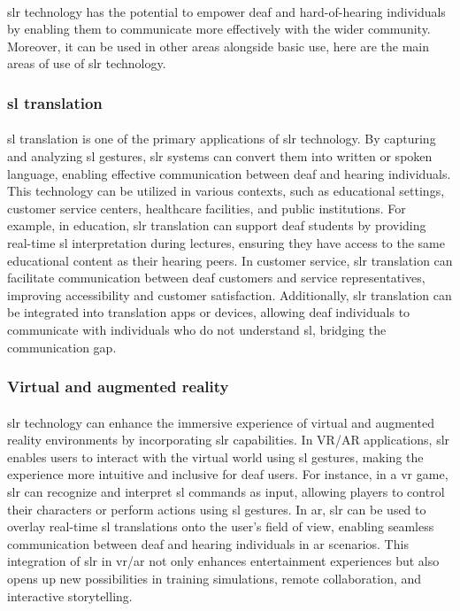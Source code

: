 \paragraph{}
\ac{slr} technology has the potential to empower deaf and hard-of-hearing individuals by enabling them to communicate more effectively with the wider community. Moreover, it can be used in other areas alongside basic use, here are the main areas of use of \ac{slr} technology.
\subsubsection{\ac{sl} translation}
\paragraph{}
\ac{sl} translation is one of the primary applications of \ac{slr} technology. By capturing and analyzing \ac{sl} gestures, \ac{slr} systems can convert them into written or spoken language, enabling effective communication between deaf and hearing individuals. This technology can be utilized in various contexts, such as educational settings, customer service centers, healthcare facilities, and public institutions. For example, in education, \ac{slr} translation can support deaf students by providing real-time \ac{sl} interpretation during lectures, ensuring they have access to the same educational content as their hearing peers. In customer service, \ac{slr} translation can facilitate communication between deaf customers and service representatives, improving accessibility and customer satisfaction. Additionally, \ac{slr} translation can be integrated into translation apps or devices, allowing deaf individuals to communicate with individuals who do not understand \ac{sl}, bridging the communication gap.
\subsubsection{Virtual and augmented reality}
\paragraph{}
\ac{slr} technology can enhance the immersive experience of virtual and augmented reality environments by incorporating \ac{slr} capabilities. In VR/AR applications, \ac{slr} enables users to interact with the virtual world using \ac{sl} gestures, making the experience more intuitive and inclusive for deaf users. For instance, in a \ac{vr} game, \ac{slr} can recognize and interpret \ac{sl} commands as input, allowing players to control their characters or perform actions using \ac{sl} gestures. In \ac{ar}, \ac{slr} can be used to overlay real-time \ac{sl} translations onto the user's field of view, enabling seamless communication between deaf and hearing individuals in \ac{ar} scenarios. This integration of \ac{slr} in \ac{vr}/\ac{ar} not only enhances entertainment experiences but also opens up new possibilities in training simulations, remote collaboration, and interactive storytelling.
